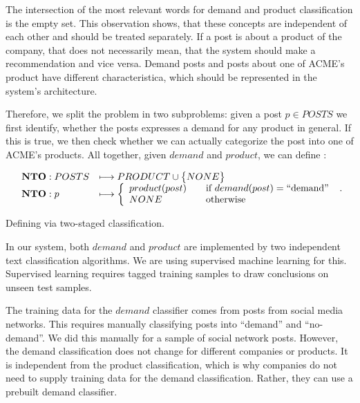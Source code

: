 The intersection of the most relevant words for demand and product classification is the empty set.
This observation shows, that these concepts are independent of each other and should be treated separately.
If a post is about a product of the company, that does not necessarily mean, that the system should make a recommendation and vice versa.
Demand posts and posts about one of ACME's product have different characteristica, which should be represented in the system's architecture.

Therefore, we split the \nto problem in two subproblems: given a post $p \in POSTS$ we first identify, whether the posts expresses a demand for any product in general.
If this is true, we then check whether we can actually categorize the post into one of ACME's products.
All together, given $demand$ and $product$, we can define \nto:



\begin{equationBlock}
	\label{equation:two-stages}
	\[
		\begin{array}{l l}
			\mathbf{NTO}: POSTS & \longmapsto PRODUCT \cup \big\{ NONE \big\} \\
			\mathbf{NTO}: p  & \longmapsto \left\{
				\begin{array}{l l}
				  product(post) & \quad \text{if}~demand(post) = \operatorname{``demand''}\\
				  NONE & \quad \text{otherwise}
				\end{array} \right.
		\end{array} .
	\]
	\caption{Defining \nto via two-staged classification.}
\end{equationBlock}

In our system, both $demand$ and $product$ are implemented by two independent text classification algorithms.
We are using supervised machine learning for this.
Supervised learning requires tagged training samples to draw conclusions on unseen test samples.

The training data for the $demand$ classifier comes from posts from social media networks.
This requires manually classifying posts into ``demand'' and ``no-demand''.
We did this manually for a sample of social network posts.
However, the demand classification does not change for different companies or products.
It is independent from the product classification, which is why companies do not need to supply training data for the demand classification.
Rather, they can use a prebuilt demand classifier.

